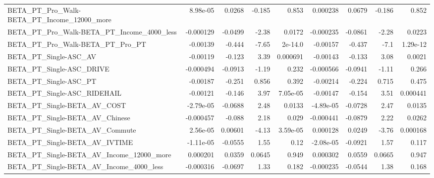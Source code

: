 \begin{tabular}{lrrrrrrrr}
BETA\_PT\_Pro\_Walk-BETA\_PT\_Income\_12000\_more         &    8.98e-05 &       0.0268 &    -0.185 &    0.853 &   0.000238 &      0.0679 &       -0.186 &         0.852 \\
BETA\_PT\_Pro\_Walk-BETA\_PT\_Income\_4000\_less          &   -0.000129 &      -0.0499 &     -2.38 &   0.0172 &  -0.000235 &     -0.0861 &        -2.28 &        0.0223 \\
BETA\_PT\_Pro\_Walk-BETA\_PT\_Pro\_PT                    &    -0.00139 &       -0.444 &     -7.65 &  2e-14.0 &   -0.00157 &      -0.437 &         -7.1 &      1.29e-12 \\
BETA\_PT\_Single-ASC\_AV                              &    -0.00119 &       -0.123 &      3.39 & 0.000691 &   -0.00143 &      -0.133 &         3.08 &        0.0021 \\
BETA\_PT\_Single-ASC\_DRIVE                           &   -0.000494 &      -0.0913 &     -1.19 &    0.232 &  -0.000566 &     -0.0941 &        -1.11 &         0.266 \\
BETA\_PT\_Single-ASC\_PT                              &    -0.00187 &       -0.251 &     0.856 &    0.392 &   -0.00214 &      -0.224 &        0.715 &         0.475 \\
BETA\_PT\_Single-ASC\_RIDEHAIL                        &    -0.00121 &       -0.146 &      3.97 & 7.05e-05 &   -0.00147 &      -0.154 &         3.51 &      0.000441 \\
BETA\_PT\_Single-BETA\_AV\_COST                        &   -2.79e-05 &      -0.0688 &      2.48 &   0.0133 &  -4.89e-05 &     -0.0728 &         2.47 &        0.0135 \\
BETA\_PT\_Single-BETA\_AV\_Chinese                     &   -0.000457 &       -0.088 &      2.18 &    0.029 &  -0.000441 &     -0.0879 &         2.22 &        0.0262 \\
BETA\_PT\_Single-BETA\_AV\_Commute                     &    2.56e-05 &      0.00601 &     -4.13 & 3.59e-05 &   0.000128 &      0.0249 &        -3.76 &      0.000168 \\
BETA\_PT\_Single-BETA\_AV\_IVTIME                      &   -1.11e-05 &      -0.0555 &      1.55 &     0.12 &  -2.08e-05 &     -0.0921 &         1.57 &         0.117 \\
BETA\_PT\_Single-BETA\_AV\_Income\_12000\_more           &    0.000201 &       0.0359 &    0.0645 &    0.949 &   0.000302 &      0.0559 &       0.0665 &         0.947 \\
BETA\_PT\_Single-BETA\_AV\_Income\_4000\_less            &   -0.000316 &      -0.0697 &      1.33 &    0.182 &  -0.000235 &     -0.0544 &         1.38 &         0.168 \\

\end{tabular}
